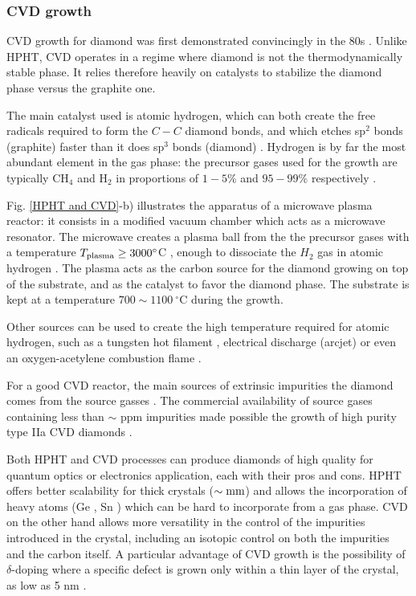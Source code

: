 \documentclass[a4paper,11pt]{report}
\begin{document}
\subsubsection{CVD growth}

CVD growth for diamond was first demonstrated convincingly in the 80s \citep{matsumoto1982growth, matsumoto1982vapor, kamo1983diamond}. Unlike HPHT, CVD operates in a regime where diamond is not the thermodynamically stable phase. It relies therefore heavily on catalysts to stabilize the diamond phase versus the graphite one. 

The main catalyst used is atomic hydrogen, which can both create the free radicals required to form the $C-C$ diamond bonds, and which etches sp$^2$ bonds (graphite) faster than it does sp$^3$ bonds (diamond) \citep{gracio2010diamond}. Hydrogen is by far the most abundant element in the gas phase: the precursor gases used for the growth are typically CH$_4$ and H$_2$ in proportions of $1-5\%$ and $95-99\%$ respectively \citep{achard2020chemical}.

Fig. \ref{HPHT and CVD}-b) illustrates the apparatus of a microwave plasma reactor: it consists in a modified vacuum chamber which acts as a microwave resonator. The microwave creates a plasma ball from the the precursor gases with a temperature $T_{\rm plasma} \geq 3000 ^\circ$C \citep{ashfold2020nitrogen}, enough to dissociate the $H_2$ gas in atomic hydrogen \citep{balmer2009chemical}. The plasma acts as the carbon source for the diamond growing on top of the substrate, and as the catalyst to favor the diamond phase. The substrate is kept at a temperature $700 \sim 1100\ ^\circ$C during the growth.

Other sources can be used to create the high temperature required for atomic hydrogen, such as a tungsten hot filament \citep{haubner1993diamond}, electrical discharge (arcjet) \citep{luque1998excited} or even an oxygen-acetylene combustion flame \citep{bachmann1991towards}.

For a good CVD reactor, the main sources of extrinsic impurities the diamond comes from the source gasses \citep{balmer2009chemical}. The commercial availability of source gases containing less than $\sim$ ppm impurities made possible the growth of  high purity type IIa CVD diamonds \citep{kasu2003high, twitchen2004high, tallaire2006characterisation}.

\medskip
Both HPHT and CVD processes can produce diamonds of high quality for quantum optics or electronics application, each with their pros and cons. HPHT offers better scalability for thick crystals ($\sim \rm mm$) and allows the incorporation of heavy atoms (Ge \citep{palyanov2015germanium} , Sn \citep{ekimov2019effect}) which can be hard to incorporate from a gas phase. CVD on the other hand allows more versatility in the control of the impurities introduced in the crystal, including an isotopic control on both the impurities and the carbon itself. A particular advantage of CVD growth is the possibility of $\delta$-doping where a specific defect is grown only within a thin layer of the crystal, as low as 5 nm \citep{ohno2012engineering, ishikawa2012optical, ohashi2013negatively}.
\end{document}

